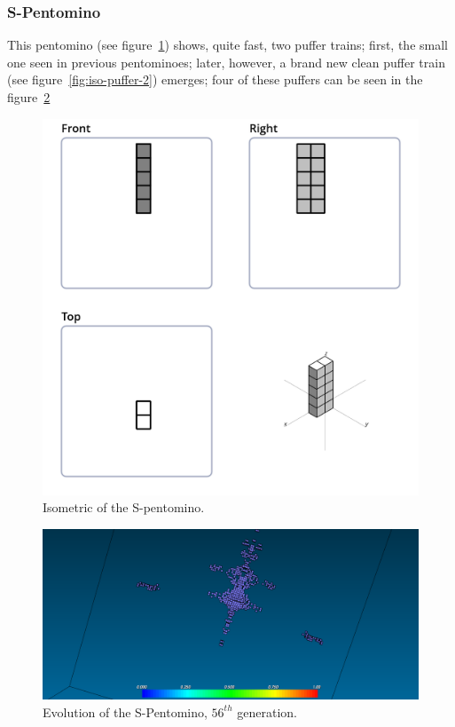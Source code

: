 \subsubsection{S-Pentomino}
\label{sec:s-pentomino}
This pentomino (see figure~\ref{fig:iso-pent-s}) shows, quite fast, two puffer
trains; first, the small one seen in previous pentominoes; later, however, a
brand new clean puffer train (see figure~\ref{fig:iso-puffer-2}) emerges; four
of these puffers can be seen in the figure~\ref{fig:ss-pent:s-56}


\begin{figure}
	\centering
	\includegraphics[scale=0.3]{iso_diagrams/o.png}
	\caption{Isometric of the S-pentomino.}
  \label{fig:iso-pent-s}
\end{figure}

\begin{figure}
	\centering
	\includegraphics[scale=0.3]{pentominoes_ss/s_56.png}
	\caption{Evolution of the S-Pentomino, $56^{th}$ generation.}
  \label{fig:ss-pent:s-56}
\end{figure}

